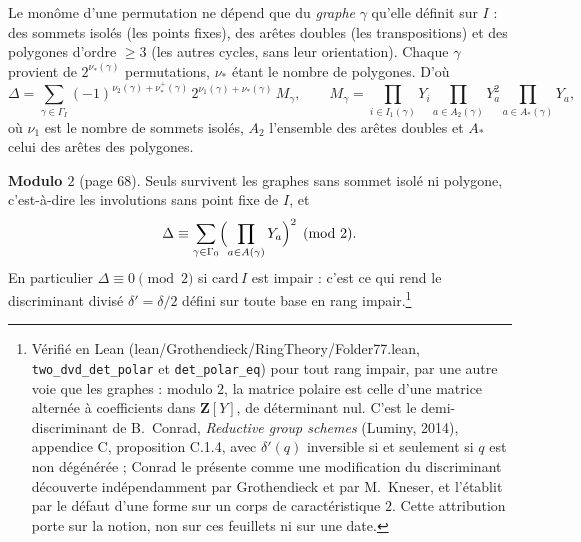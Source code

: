 \documentclass[11pt,a4paper]{article}
\begin{document}
Le monôme d'une permutation ne dépend que du \emph{graphe} $\gamma$ qu'elle définit
sur $I$ : des sommets isolés (les points fixes), des arêtes doubles (les
transpositions) et des polygones d'ordre $\geq 3$ (les autres cycles, sans leur
orientation). Chaque $\gamma$ provient de $2^{\nu_*(\gamma)}$ permutations, $\nu_*$
étant le nombre de polygones. D'où
\[
  \Delta = \sum_{\gamma \in \Gamma_I} (-1)^{\nu_2(\gamma) + \nu_*^+(\gamma)}\,
  2^{\nu_1(\gamma) + \nu_*(\gamma)}\, M_\gamma, \qquad
  M_\gamma = \prod_{i \in I_1(\gamma)} Y_i \prod_{a \in A_2(\gamma)} Y_a^2
  \prod_{a \in A_*(\gamma)} Y_a ,
\]
où $\nu_1$ est le nombre de sommets isolés, $A_2$ l'ensemble des arêtes doubles et
$A_*$ celui des arêtes des polygones.

\textbf{Modulo $2$} (page 68). Seuls survivent les graphes sans sommet isolé ni
polygone, c'est-à-dire les involutions sans point fixe de $I$, et
\[
  \Delta \equiv \sum_{\gamma \in \Gamma_0} \Bigl(\prod_{a \in A(\gamma)} Y_a\Bigr)^2
  \pmod 2 .
\]
En particulier $\Delta \equiv 0 \pmod 2$ si $\mathrm{card}\, I$ est impair : c'est ce qui
rend le discriminant divisé $\delta' = \delta/2$ défini sur toute base en rang
impair.\footnote{Vérifié en Lean (lean/Grothendieck/RingTheory/Folder77.lean,
\texttt{two\_dvd\_det\_polar} et \texttt{det\_polar\_eq}) pour tout rang impair,
par une autre voie que les graphes : modulo $2$, la matrice polaire est celle
d'une matrice alternée à coefficients dans $\mathbf{Z}[Y]$, de déterminant nul.
C'est le demi-discriminant de B.~Conrad, \emph{Reductive group schemes}
(Luminy, 2014), appendice C, proposition C.1.4, avec $\delta'(q)$ inversible si
et seulement si $q$ est non dégénérée ; Conrad le présente comme une
modification du discriminant découverte indépendamment par Grothendieck et
par M.~Kneser, et l'établit par le défaut d'une forme sur un corps de
caractéristique $2$. Cette attribution porte sur la notion, non sur ces
feuillets ni sur une date.}
\end{document}

